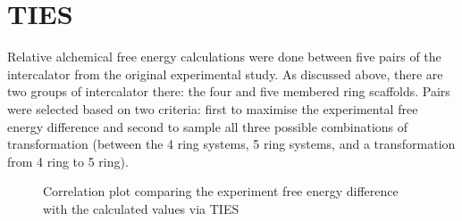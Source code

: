 \section{TIES}

Relative alchemical free energy calculations were done between five pairs of the intercalator from the original experimental study. As discussed above, there are two groups of intercalator there: the four and five membered ring scaffolds. Pairs were selected based on two criteria: first to maximise the experimental free energy difference and second to sample all three possible combinations of transformation (between the 4 ring systems, 5 ring systems, and a transformation from 4 ring to 5 ring). 

\begin{figure}[h!]
  
  \caption{Correlation plot comparing the experiment free energy difference with the calculated values via TIES}
  \label{fig:ties}
\end{figure}